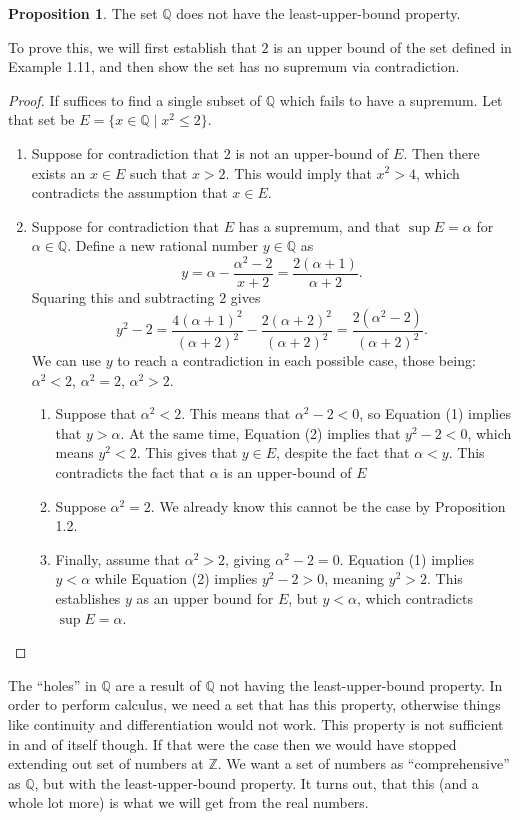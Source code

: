 \documentclass{article}
\newcommand{\Q}{\mathbb{Q}}
\newcommand{\Z}{\mathbb{Z}}
\theoremstyle{definition}
\newtheorem{proposition}{Proposition}[section]
\begin{document}
	\begin{proposition}
		The set $ \Q $ does not have the least-upper-bound property.
	\end{proposition}
	To prove this, we will first establish that $ 2 $ is an upper bound of the set defined in Example 1.11, and then show the set has no supremum via contradiction.
	\begin{proof}
		If suffices to find a single subset of $ \Q $ which fails to have a supremum. Let that set be $ E=\{x\in\Q\mid x^2\le 2\} $. 
		\begin{enumerate}
			\item Suppose for contradiction that $ 2 $ is not an upper-bound of $ E $. Then there exists an $ x\in E $ such that $ x>2 $. This would imply that $ x^2>4 $, which contradicts the assumption that $ x \in E $. 
			\item Suppose for contradiction that $ E $ has a supremum, and that $ \sup E=\alpha $ for $ \alpha\in\Q $. Define a new rational number $ y\in \Q $ as 
			\begin{equation}
				y=\alpha-\frac{\alpha^2-2}{x+2}=\frac{2(\alpha+1)}{\alpha+2}.
			\end{equation}
			Squaring this and subtracting $ 2 $ gives 
			\begin{equation}
				y^2-2=\frac{4(\alpha+1)^2}{(\alpha+2)^2}-\frac{2(\alpha+2)^2}{(\alpha+2)^2}=\frac{2(\alpha^2-2)}{(\alpha+2)^2}.
			\end{equation} We can use $ y $ to reach a contradiction in each possible case, those being: $ \alpha^2<2 $, $ \alpha^2=2 $, $ \alpha^2>2 $.
			\begin{enumerate}
				\item Suppose that $ \alpha^2<2 $. This means that $ \alpha^2-2<0 $, so Equation (1) implies that $ y>\alpha $. At the same time, Equation (2) implies that $ y^2-2<0 $, which means $ y^2<2 $. This gives that $ y\in E $, despite the fact that $ \alpha<y $. This contradicts the fact that $ \alpha $ is an upper-bound of $ E $
				\item Suppose $ \alpha^2=2 $. We already know this cannot be the case by Proposition 1.2. 
				\item  Finally, assume that $ \alpha^2>2 $, giving $ \alpha^2-2=0 $. Equation (1)	implies $ y<\alpha $ while Equation (2) implies $ y^2-2>0 $, meaning $ y^2>2 $. This establishes $ y $ as an upper bound for $ E $, but $ y<\alpha $, which contradicts $ \sup E=\alpha $.  
			\end{enumerate}
		\end{enumerate}
	\end{proof}
	The ``holes'' in $ \Q $ are a result of $ \Q $ not having the least-upper-bound property. In order to perform calculus, we need a set that has this property, otherwise things like continuity and differentiation would not work. This property is not sufficient in and of itself though. If that were the case then we would have stopped extending out set of numbers at $ \Z $. We want a set of numbers as ``comprehensive'' as $ \Q $, but with the least-upper-bound property. It turns out, that this (and a whole lot more) is what we will get from the real numbers.  
\end{document}
